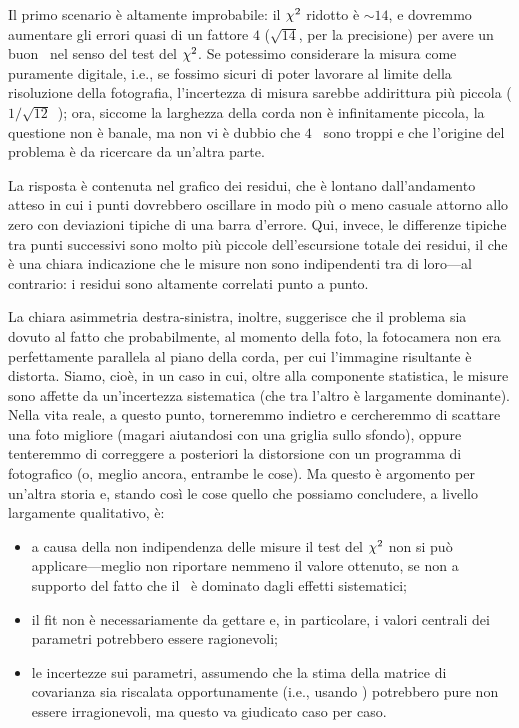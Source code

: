 Il primo scenario è altamente improbabile: il $\chi^2$ ridotto è $\sim 14$,
e dovremmo aumentare gli errori quasi di un fattore $4$ ($\sqrt{14}$, per la
precisione) per avere un buon \fit\ nel senso del test del $\chi^2$.
Se potessimo considerare la misura come puramente digitale, i.e., se fossimo
sicuri di poter lavorare al limite della risoluzione della fotografia, l'incertezza
di misura sarebbe addirittura più piccola ($1/\sqrt{12}$~); ora,
siccome la larghezza della corda non è infinitamente piccola, la questione non
è banale, ma non vi è dubbio che $4$~ sono troppi e che
l'origine del problema è da ricercare da un'altra parte.

La risposta è contenuta nel grafico dei residui, che è lontano dall'andamento
atteso in cui i punti dovrebbero oscillare in modo più o meno casuale attorno
allo zero con deviazioni tipiche di una barra d'errore. Qui, invece, le differenze
tipiche tra punti successivi sono molto più piccole dell'escursione totale dei
residui, il che è una chiara indicazione che le misure non sono indipendenti tra
di loro---al contrario: i residui sono altamente correlati punto a punto.

La chiara asimmetria destra-sinistra, inoltre, suggerisce che il problema sia
dovuto al fatto che probabilmente, al momento della foto, la fotocamera non era
perfettamente parallela al piano della corda, per cui l'immagine risultante è
distorta. Siamo, cioè, in un caso in cui, oltre alla componente statistica,
le misure sono affette da un'incertezza sistematica (che tra l'altro è largamente
dominante). Nella vita reale, a questo punto, torneremmo indietro e cercheremmo
di scattare una foto migliore (magari aiutandosi con una griglia sullo sfondo),
oppure tenteremmo di correggere a posteriori la distorsione con un programma di
 fotografico (o, meglio ancora, entrambe le cose). Ma questo è
argomento per un'altra storia e, stando così le cose quello che possiamo
concludere, a livello largamente qualitativo, è:
\begin{itemize}
  \item a causa della non indipendenza delle misure il test del $\chi^2$ non
  si può applicare---meglio non riportare nemmeno il valore ottenuto, se non
  a supporto del fatto che il \fit\ è dominato dagli effetti sistematici;
  \item il fit non è necessariamente da gettare e, in particolare, i valori
  centrali dei parametri potrebbero essere ragionevoli;
  \item le incertezze sui parametri, assumendo che la stima della matrice di
  covarianza sia riscalata opportunamente (i.e., usando )
  potrebbero pure non essere irragionevoli, ma questo va giudicato caso per caso.
\end{itemize}


